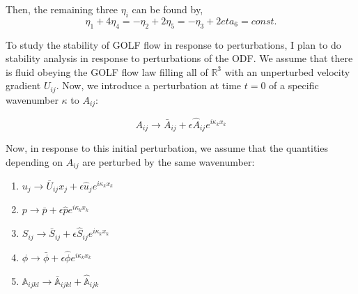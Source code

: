 \documentclass{report}
\begin{document}
Then, the remaining three $\eta_i$ can be found by,
\begin{equation}
   \eta_1 + 4 \eta_4 = -\eta_2 + 2 \eta_5 = -\eta_3 + 2 eta_6 = const.
\end{equation}

To study the stability of GOLF flow in response to perturbations, I plan to do stability analysis in response to perturbations of the ODF. We assume that there is fluid obeying the GOLF flow law filling all of $\mathbb{R}^3$ with an unperturbed velocity gradient $U_{ij}$. Now, we introduce a perturbation at time $t=0$ of a specific wavenumber $\kappa$ to $A_{ij}$:

\begin{equation}
   A_{ij} \rightarrow \bar{A}_{ij} +  \epsilon \hat{A}_{ij} e^{i \kappa_k x_k}
\end{equation}

Now, in  response to this initial perturbation, we assume that the quantities depending on $A_{ij}$ are perturbed by the same wavenumber:

\begin{enumerate}
   \item $u_j \rightarrow \bar{U}_{ij}x_j +  \epsilon \hat{u}_j e^{i \kappa_k x_k}$
   \item $p \rightarrow \bar{p} + \epsilon \hat{p} e^{i \kappa_k x_k}$
   \item $S_{ij} \rightarrow \bar{S}_{ij} +  \epsilon \hat{S}_{ij} e^{i \kappa_k x_k}$
   \item $\phi \rightarrow \bar{\phi} + \epsilon \hat{\phi} e^{i \kappa_k x_k}$
   \item $\mathbb{A}_{ijkl} \rightarrow \bar{\mathbb{A}}_{ijkl} + \hat{\mathbb{A}}_{ijk}$
\end{enumerate}
\end{document}
